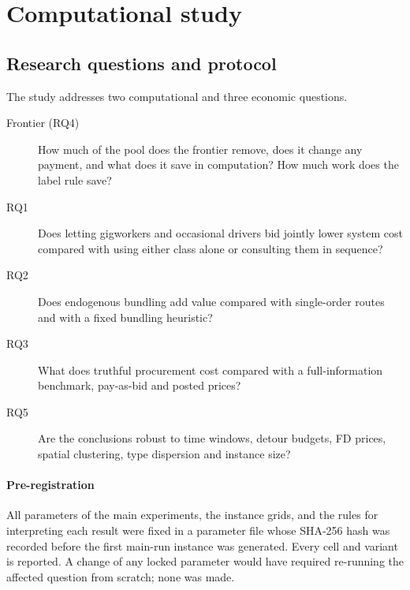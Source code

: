 \documentclass[review,12pt]{elsarticle}
\theoremstyle{definition}
\theoremstyle{remark}
\begin{document}
\section{Computational study}
\label{sec:experiments}

\subsection{Research questions and protocol}

The study addresses two computational and three economic questions.
\begin{description}
\item[Frontier (RQ4)] How much of the pool does the frontier remove, does it
change any payment, and what does it save in computation? How much work does
the label rule save?
\item[RQ1] Does letting gigworkers and occasional drivers bid jointly lower
system cost compared with using either class alone or consulting them in
sequence?
\item[RQ2] Does endogenous bundling add value compared with single-order
routes and with a fixed bundling heuristic?
\item[RQ3] What does truthful procurement cost compared with a
full-information benchmark, pay-as-bid and posted prices?
\item[RQ5] Are the conclusions robust to time windows, detour budgets, FD
prices, spatial clustering, type dispersion and instance size?
\end{description}

\paragraph{Pre-registration} All parameters of the main experiments, the
instance grids, and the rules for interpreting each result were fixed in a
parameter file whose SHA-256 hash was recorded before the first main-run
instance was generated. Every cell and variant is reported. A change of any
locked parameter would have required re-running the affected question from
scratch; none was made.
\end{document}
